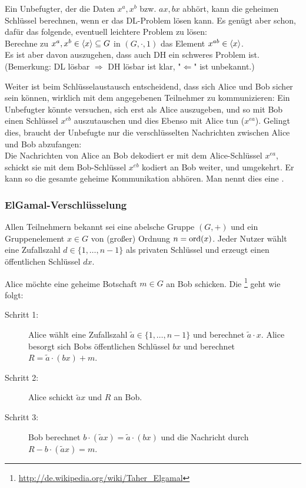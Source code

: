 \begin{bem}
	Ein Unbefugter, der die Daten $x^a, x^b$ bzw. $ax,bx$ abhört, kann die geheimen Schlüssel berechnen, wenn er das DL-Problem lösen kann. 
	Es genügt aber schon, dafür das folgende, eventuell leichtere Problem zu lösen: \\
	Berechne zu $x^a, x^b \in \langle x\rangle \subseteq G$ in $(G,\cdot,1)$ das Element $x^{ab} \in \langle x\rangle$. \\
	Es ist aber davon auszugehen, dass auch DH ein schweres Problem ist. \\
	(Bemerkung: DL lösbar $\Rightarrow$ DH lösbar ist klar, "$\Leftarrow$" ist unbekannt.)
\end{bem}

\begin{bem}
	Weiter ist beim Schlüsselaustausch entscheidend, dass sich Alice und Bob sicher sein können, wirklich mit dem angegebenen Teilnehmer zu kommunizieren: Ein Unbefugter könnte versuchen, sich erst als Alice auszugeben, und so mit Bob einen Schlüssel $x^{eb}$ auszutauschen und dies Ebenso mit Alice tun ($x^{ea}$). 
	Gelingt dies, braucht der Unbefugte nur die verschlüsselten Nachrichten zwischen Alice und Bob abzufangen: \\
	Die Nachrichten von Alice an Bob dekodiert er mit dem Alice-Schlüssel $x^{ea}$, schickt sie mit dem Bob-Schlüssel $x^{eb}$ kodiert an Bob weiter, und umgekehrt. 
	Er kann so die gesamte geheime Kommunikation abhören. 
	Man nennt dies eine .
\end{bem}

\nextlecture
\subsubsection{ElGamal-Verschlüsselung}
\label{subsub:1.2.3}
	Allen Teilnehmern bekannt sei eine abelsche Gruppe $(G,+)$ \marginnote{[6]} und ein Gruppenelement $x \in G$ von (großer) Ordnung $n = \operatorname{ord}(x)$. 
	Jeder Nutzer wählt eine Zufallszahl $d \in \{1, \dots, n-1\}$ als privaten Schlüssel und erzeugt einen öffentlichen Schlüssel $dx$.
	
\begin{anw}
	Alice möchte eine geheime Botschaft $m \in G$ an Bob schicken. 
	Die \footnote{\url{http://de.wikipedia.org/wiki/Taher_Elgamal}} geht wie folgt: 
	\begin{description}
		\item[Schritt 1:] Alice wählt eine Zufallszahl $\tilde{a} \in \{1, \dots, n-1\}$ und berechnet $\tilde{a} \cdot x$. 
		Alice besorgt sich Bobs öffentlichen Schlüssel $bx$ und berechnet $R = \tilde{a} \cdot (bx) + m$.
		\item[Schritt 2:] Alice schickt $\tilde{a}x$ und $R$ an Bob.
		\item[Schritt 3:] Bob berechnet $b \cdot (\tilde{a}x) = \tilde{a} \cdot (bx)$ und die Nachricht durch $R - b\cdot(\tilde{a}x) = m$.
	\end{description}
\end{anw}

